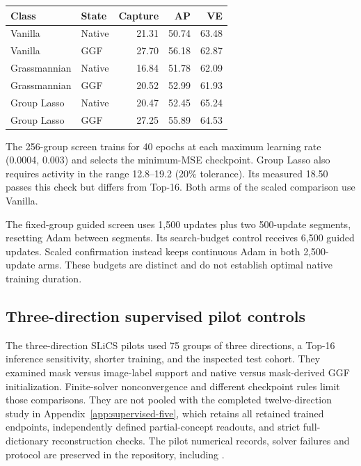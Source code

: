 \begin{agfresulttable}
\caption{The 256-group baseline screen on 800 test images, seed 1. Scores are percentages.}\label{tab:released-screen-detail}
\begin{tabular}{@{}llrrr@{}}
\toprule
Class & State & Capture & AP & VE \\
\midrule
Vanilla & Native & 21.31 & 50.74 & 63.48 \\
Vanilla & GGF & 27.70 & 56.18 & 62.87 \\
Grassmannian & Native & 16.84 & 51.78 & 62.09 \\
Grassmannian & GGF & 20.52 & 52.99 & 61.93 \\
Group Lasso & Native & 20.47 & 52.45 & 65.24 \\
Group Lasso & GGF & 27.25 & 55.89 & 64.53 \\
\bottomrule
\end{tabular}

\end{agfresulttable}

The 256-group screen trains for 40 epochs at each maximum learning rate
(0.0004, 0.003) and selects the minimum-MSE checkpoint. Group Lasso also
requires activity in the range 12.8--19.2 (20\% tolerance). Its measured 18.50
passes this check but differs from Top-16. Both arms of the scaled comparison
use Vanilla.

The fixed-group guided screen uses 1,500 updates plus two 500-update segments, resetting Adam between segments. Its search-budget control receives 6,500 guided updates. Scaled confirmation instead keeps continuous Adam in both 2,500-update arms. These budgets are distinct and do not establish optimal native training duration.

\subsection{Three-direction supervised pilot controls}\label{app:maskinit}\label{app:pending}\label{app:slics-results}
The three-direction SLiCS pilots used 75 groups of three directions, a Top-16
inference sensitivity, shorter training, and the inspected test cohort.
They examined mask versus image-label support and native versus mask-derived
GGF initialization. Finite-solver nonconvergence and different checkpoint
rules limit those comparisons. They are not pooled with the completed
twelve-direction study in Appendix~\ref{app:supervised-five}, which retains
all retained trained endpoints, independently defined partial-concept readouts,
and strict full-dictionary reconstruction checks. The pilot numerical
records, solver failures and protocol are preserved in the repository,
including .
